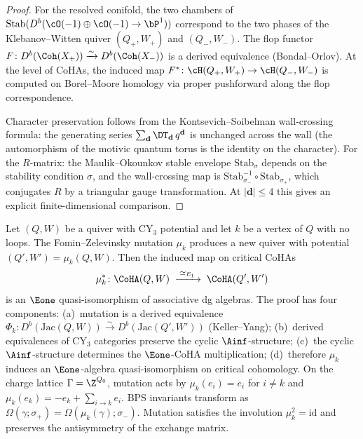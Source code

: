\begin{proof}
For the resolved conifold, the two chambers of $\mathrm{Stab}(D^b(\cO(-1) \oplus \cO(-1) \to \bP^1))$ correspond to the two phases of the Klebanov--Witten quiver $(Q_+, W_+)$ and $(Q_-, W_-)$. The flop functor $F \colon D^b(\Coh(X_+)) \xrightarrow{\sim} D^b(\Coh(X_-))$ is a derived equivalence (Bondal--Orlov). At the level of CoHAs, the induced map $F^* \colon \cH(Q_+, W_+) \to \cH(Q_-, W_-)$ is computed on Borel--Moore homology via proper pushforward along the flop correspondence.

Character preservation follows from the Kontsevich--Soibelman wall-crossing formula: the generating series $\sum_{\mathbf{d}} \DT_{\mathbf{d}} \, q^{\mathbf{d}}$ is unchanged across the wall (the automorphism of the motivic quantum torus is the identity on the character). For the $R$-matrix: the Maulik--Okounkov stable envelope $\mathrm{Stab}_\sigma$ depends on the stability condition $\sigma$, and the wall-crossing map is $\mathrm{Stab}_{\sigma_-}^{-1} \circ \mathrm{Stab}_{\sigma_+}$, which conjugates $R$ by a triangular gauge transformation. At $|\mathbf{d}| \leq 4$ this gives an explicit finite-dimensional comparison.
\end{proof}


\begin{proposition}[Quiver mutation = \texorpdfstring{$\Eone$}{E1} quasi-isomorphism]
\label{prop:mutation-e1-equivalence}
Let $(Q, W)$ be a quiver with CY$_3$ potential and let $k$ be a vertex of $Q$ with no loops. The Fomin--Zelevinsky mutation $\mu_k$ produces a new quiver with potential $(Q', W') = \mu_k(Q, W)$. Then the induced map on critical CoHAs
\[
 \mu_k^* \colon \CoHA(Q, W) \;\xrightarrow{\;\simeq_{E_1}\;}\; \CoHA(Q', W')
\]
is an $\Eone$ quasi-isomorphism of associative dg algebras.  The proof has four components: (a)~mutation is a derived equivalence $\Phi_k \colon D^b(\mathrm{Jac}(Q,W)) \xrightarrow{\sim} D^b(\mathrm{Jac}(Q',W'))$ (Keller--Yang); (b)~derived equivalences of CY$_3$ categories preserve the cyclic $\Ainf$-structure; (c)~the cyclic $\Ainf$-structure determines the $\Eone$-CoHA multiplication; (d)~therefore $\mu_k$ induces an $\Eone$-algebra quasi-isomorphism on critical cohomology. On the charge lattice $\Gamma = \Z^{Q_0}$, mutation acts by $\mu_k(e_i) = e_i$ for $i \neq k$ and $\mu_k(e_k) = -e_k + \sum_{i \to k} e_i$. BPS invariants transform as $\Omega(\gamma;\sigma_+) = \Omega(\mu_k(\gamma);\sigma_-)$. Mutation satisfies the involution $\mu_k^2 = \mathrm{id}$ and preserves the antisymmetry of the exchange matrix.
\end{proposition}


